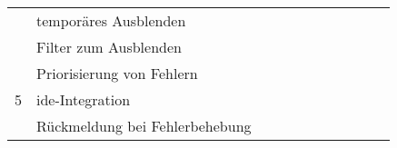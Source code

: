 \begin{table}[htp]
\begin{tabular}{lllllllllll}
                                                                                  & temporäres Ausblenden                                                                                         &                             &                            &                            &                                  &                      &                         &                                         &                           &                                        \\
                                                                                  & Filter zum Ausblenden                                                                                         &                             &                            &                            &                                  &                      &                         &                                         &                           &                                        \\
    \midrule
    \multirow{3}{*}{5}                                                            & Priorisierung von Fehlern                                                                                     &                             &                            &                            &                                  &                      &                         &                                         &                           &                                        \\
                                                                                  & \ac{ide}-Integration                                                                                          &                             &                            &                            &                                  &                      &                         &                                         &                           &                                        \\
                                                                                  & Rückmeldung bei Fehlerbehebung                                                                                &                             &                            &                            &                                  &                      &                         &                                         &                           &                                        \\

\end{tabular}
\end{table}
